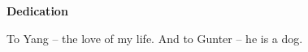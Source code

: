 {}
\begin{center}
  \textbf{Dedication}

  To Yang -- the love of my life.
  And to Gunter -- he is a dog.
\end{center}

\cleardoublepage
